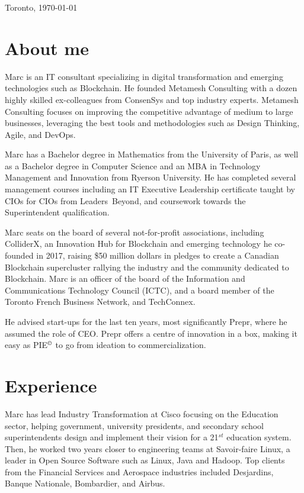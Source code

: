 \documentclass[11pt,letterpaper,sans]{moderncv}        %
\begin{document}
\maketitle
\recomputeletterlengths
\begin{flushright}
	Toronto, \today
	\vspace{-1em}
\end{flushright}
\section{About me}
Marc is an IT consultant specializing in digital transformation and emerging technologies such as Blockchain. 
He founded Metamesh Consulting with a dozen highly skilled ex-colleagues from ConsenSys and top industry experts.
Metamesh Consulting focuses on improving the competitive advantage of medium to large businesses, leveraging the best tools and methodologies such as Design Thinking, Agile, and DevOps.

Marc has a Bachelor degree in Mathematics from the University of Paris, as well as a Bachelor degree in Computer Science  and an MBA in Technology Management and Innovation from Ryerson University.
He has completed several management courses including an IT Executive Leadership certificate taught by CIOs for CIOs from Leaders~Beyond, and coursework towards the Superintendent qualification.

Marc seats on the board of several not-for-profit associations, including ColliderX, an Innovation Hub for Blockchain and emerging technology he co-founded in 2017, raising \$50 million dollars in pledges to create a Canadian Blockchain supercluster rallying the industry and the community dedicated to Blockchain. 
Marc is an officer of the board of the Information and Communications Technology Council (ICTC), and a board member of the Toronto French Business Network, and TechConnex.

He advised start-ups for the last ten years, most significantly Prepr, where he assumed the role of CEO.
Prepr offers a centre of innovation in a box, making it easy as PIE$^\copyright$ to go from ideation to commercialization.

\section{Experience}
Marc has lead Industry Transformation at Cisco focusing on the Education sector, helping government, university presidents, and secondary school superintendents design and implement their vision for a 21$^{st}$ education system.
Then, he worked two years closer to engineering teams at Savoir-faire Linux, a leader in Open Source Software such as Linux, Java and Hadoop. %
Top clients from the Financial Services and Aerospace industries included Desjardins, Banque Nationale, Bombardier, and Airbus.
\end{document}

